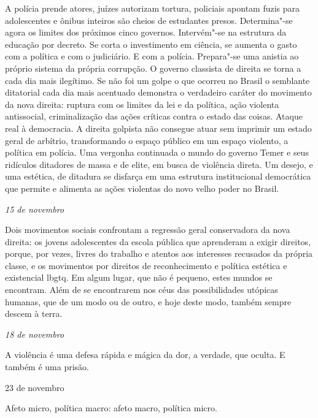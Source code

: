 A polícia prende atores, juízes autorizam tortura, policiais apontam
fuzis para adolescentes e ônibus inteiros são cheios de estudantes
presos. Determina"-se agora os limites dos próximos cinco governos.
Intervém"-se na estrutura da educação por decreto. Se corta o
investimento em ciência, se aumenta o gasto com a política e com o
judiciário. E com a polícia. Prepara"-se uma anistia ao próprio sistema
da própria corrupção. O governo classista de direita se torna a cada dia
mais ilegítimo. Se não foi um golpe o que ocorreu no Brasil o semblante
ditatorial cada dia mais acentuado demonstra o verdadeiro caráter do
movimento da nova direita: ruptura com os limites da lei e da política,
ação violenta antissocial, criminalização das ações críticas contra o
estado das coisas. Ataque real à democracia. A direita golpista não
consegue atuar sem imprimir um estado geral de arbítrio, transformando o
espaço público em um espaço violento, a política em polícia. Uma
vergonha continuada o mundo do governo Temer e seus ridículos ditadores
de massa e de elite, em busca de violência direta. Um desejo, e uma
estética, de ditadura se disfarça em uma estrutura institucional
democrática que permite e alimenta as ações violentas do novo velho
poder no Brasil.

\begin{flushright}
\emph{15 de novembro}
\end{flushright}

Dois movimentos sociais confrontam a regressão geral conservadora da
nova direita: os jovens adolescentes da escola pública que aprenderam a
exigir direitos, porque, por vezes, livres do trabalho e atentos aos
interesses recusados da própria classe, e os movimentos por direitos de
reconhecimento e política estética e existencial lbgtq. Em algum lugar,
que não é pequeno, estes mundos se encontram. Além de se encontrarem nos
céus das possibilidades utópicas humanas, que de um modo ou de outro, e
hoje deste modo, também sempre descem à terra.

\begin{flushright}
\emph{18 de novembro}
\end{flushright}

A violência é uma defesa rápida e mágica da dor, a verdade, que oculta.
E também é uma prisão.

\begin{flushright}
23 de novembro
\end{flushright}

Afeto micro, política macro: afeto macro, política micro.

